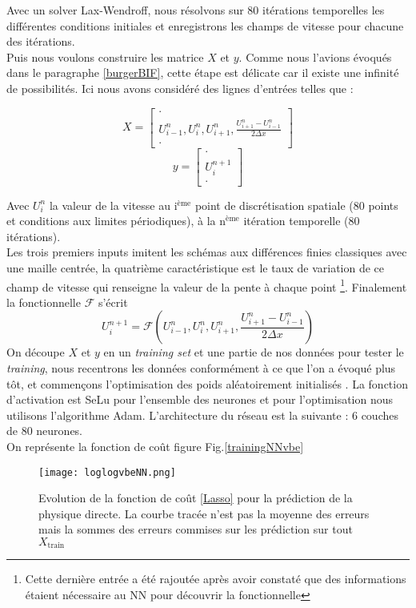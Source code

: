 \documentclass[a4paper,12pt]{article}
\newcommand{\bepar}[1]{
	\left( #1 \right)  
}
\numberwithin{equation}{section} %
\begin{document}
\noindent Avec un solver Lax-Wendroff, nous résolvons sur 80 itérations temporelles les différentes conditions initiales et enregistrons les champs de vitesse pour chacune des itérations.\\
Puis nous voulons construire les matrice $X$ et $y$. Comme nous l'avions évoqués dans le paragraphe \eqref{burgerBIF}, cette étape est délicate car il existe une infinité de possibilités. Ici nous avons considéré des lignes d'entrées telles que :
\begin{multicols}{2}
	\noindent
	$$ X = \left[ \begin{array}{c} \cdot \\ U^n_{i-1},U^n_{i}, U^n_{i+1}, \frac{U^n_{i+1} - U^n_{i-1}}{2\Delta x}  \\ \cdot 
					  \end{array}
		   \right]
	$$
	\columnbreak
	$$ y = \left[ \begin{array}{c} \cdot \\ U^{n+1}_i \\ \cdot 
			  \end{array}
	   \right]
	$$
	\end{multicols}
  
\noindent Avec $U_i^n$ la valeur de la vitesse au i$^{\text{ème}}$ point de discrétisation spatiale (80 points et conditions aux limites périodiques), à la n$^{\text{ème}}$ itération temporelle (80 itérations). \\
 Les trois premiers inputs imitent les schémas aux différences finies classiques avec une maille centrée, la quatrième caractéristique est le taux de variation de ce champ de vitesse qui renseigne la valeur de la pente à chaque point \footnote{Cette dernière entrée a été rajoutée après avoir constaté que des informations étaient nécessaire au NN pour découvrir la fonctionnelle}.
 Finalement la fonctionnelle $\mathcal{F}$ s'écrit $$U^{n+1}_i =  \mathcal{F}\bepar{U^n_{i-1},U^n_{i}, U^n_{i+1}, \frac{U^n_{i+1} - U^n_{i-1}}{2\Delta x}}$$
   On découpe $X$ et $y$ en un \textit{training set} et une partie de nos données pour tester le \textit{training}, nous recentrons les données conformément à ce que l'on a évoqué plus tôt, et commençons l'optimisation des poids aléatoirement initialisés \citep{Goodfellow-et-al-2016}. La fonction d'activation est SeLu pour l'ensemble des neurones et pour l'optimisation nous utilisons l'algorithme Adam. L'architecture du réseau est la suivante : 6 couches de 80 neurones.\\
    On représente la fonction de coût figure Fig.\eqref{trainingNNvbe}
    \begin{figure}[!ht]
    \centering
    \texttt{[image: loglogvbeNN.png]}
    \caption{\small{Evolution de la fonction de coût \eqref{Lasso}} pour la prédiction de la physique directe. La courbe tracée n'est pas la moyenne des erreurs mais la sommes des erreurs commises sur les prédiction sur tout $X_{\text{train}}$ }
    \label{trainingNNvbe}
    \end{figure}
    
\end{document}
